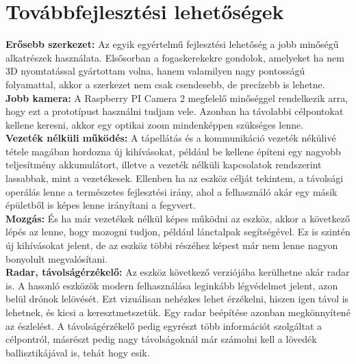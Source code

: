 \chapter{Továbbfejlesztési lehetőségek}
\textbf{Erősebb szerkezet:} Az egyik egyértelmű fejlesztési lehetőség a jobb minőségű alkatrészek használata. Elsősorban a fogaskerekekre gondolok, amelyeket ha nem 3D nyomtatással gyártottam volna, hanem valamilyen nagy pontosságú folyamattal, akkor a szerkezet nem csak csendesebb, de precízebb is lehetne.\\

\textbf{Jobb kamera:} A Raspberry PI Camera 2 megfelelő minőséggel rendelkezik arra, hogy ezt a prototípust használni tudjam vele. Azonban ha távolabbi célpontokat kellene keresni, akkor egy optikai zoom mindenképpen szükséges lenne.\\

\textbf{Vezeték nélküli működés:} A tápellátás és a kommunikáció vezeték nékülivé tétele magában hordozna új kihívásokat, például be kellene építeni egy nagyobb teljesítmény akkumulátort, illetve a vezeték nélküli kapcsolatok rendszerint lassabbak, mint a vezetékesek. Ellenben ha az eszköz célját tekintem, a távolsági operálás lenne a természetes fejlesztési irány, ahol a felhasználó akár egy másik épületből is képes lenne irányítani a fegyvert.\\

\textbf{Mozgás:} És ha már vezetékek nélkül képes működni az eszköz, akkor a következő lépés az lenne, hogy mozogni tudjon, például lánctalpak segítségével. Ez is szintén új kihívásokat jelent, de az eszköz többi részéhez képest már nem lenne nagyon bonyolult megvalósítani.\\

\textbf{Radar, távolságérzékelő:} Az eszköz következő verziójába kerülhetne akár radar is. A hasonló eszközök modern felhasználása leginkább légvédelmet jelent, azon belül drónok lelövését. Ezt vizuálisan nehézkes lehet érzékelni, hiszen igen távol is lehetnek, és kicsi a keresztmetszetük. Egy radar beépítése azonban megkönnyítené az észlelést. A távolságérzékelő pedig egyrészt több információt szolgáltat a célpontról, másrészt pedig nagy távolságoknál már számolni kell a lövedék ballisztikájával is, tehát hogy esik.
